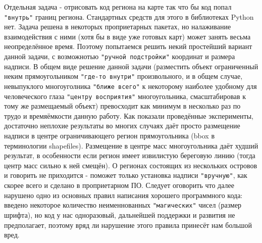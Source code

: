 \documentclass[11pt]{article}
\begin{document}
    Отдельная задача - отрисовать код региона на карте так что бы код попал
\verb'"внутрь"' границ региона. Стандартных средств для этого в
библиотеках Python нет. Задача решена в некоторых проприетарных пакетах,
но налаживание взаимодействия с ними (хотя бы в виде уже готовых карт)
может занять весьма неопределённое время. Поэтому попытаемся решить
некий простейший вариант данной задачи, с возможнотью
\verb'"ручной подстройки"' координат и размера надписи. В общем виде
решение данной задачи (разместить объект ограниченный неким
прямоугольником \verb'"где-то внутри"' произвольного, и в общем случае,
невыпуклого многоуголника \verb'"ближе всего"' к некоторому наиболее
удобному для человеческого глаза \verb'"центру восприятия"'
многоугольника, смасштабировав к тому же размещаемый объект) превосходит
как минимум в несколько раз по трудо и времяёмкости данную работу. Как
показали проведённые эксперименты, достаточно неплохие результаты во
многих случаях даёт просто размещение надписи в центре ограничивающего
регион прямоугольника (bbox в терминологии shapefiles). Размещение в
центре масс многоугольника даёт худший результат, в особенности если
регион имеет извилистую береговую линию (тогда центр масс сильно к ней
смещён). О регионах состоящих из нескольких островов и говорить не
приходится - поможет только установка надписи \verb'"вручную"', как
скорее всего и сделано в проприетарном ПО. Следует оговорить что далее
нарушено одно из основных правил написания хорошего программного кода:
введено некоторое количество неименнованных \verb'"магических"' чисел
(размер шрифта), но код у нас одноразовый, дальнейшей поддержки и
развития не предполагает, поэтому вряд ли нарушение этого правила
принесёт нам большой вред.
\end{document}
